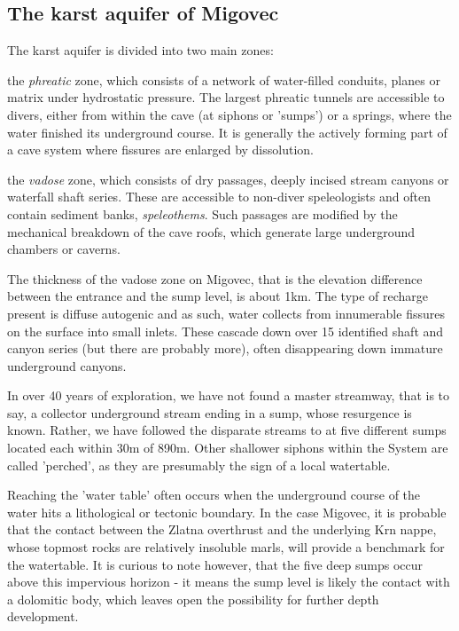 \subsection{The karst aquifer of Migovec} 
The karst aquifer is divided into two main zones: \begin{citemize} 
\item the \emph{phreatic} zone, which consists of a network of water-filled conduits, planes or matrix under hydrostatic pressure. The largest phreatic tunnels are accessible to divers, either from within the cave (at siphons or 'sumps') or a springs, where the water finished its underground course. It is generally the actively forming part of a cave system where fissures are enlarged by dissolution.
\item the \emph{vadose} zone, which consists of dry passages, deeply incised stream canyons or waterfall shaft series. These are accessible to non-diver speleologists and often contain sediment banks, \emph{speleothems}. Such passages are modified by the mechanical breakdown of the cave roofs, which generate large underground chambers or caverns.
\end{citemize}

The thickness of the vadose zone on Migovec, that is the elevation difference between the entrance and the sump level, is about 1km. The type of recharge present is diffuse autogenic and as such, water collects from innumerable fissures on the surface into small inlets. These cascade down over 15 identified shaft and canyon series (but there are probably more), often disappearing down immature underground canyons. 

In over 40 years of exploration, we have not found a master streamway, that is to say, a collector underground stream ending in a sump, whose resurgence is known. Rather, we have followed the disparate streams to at five different sumps located each within 30m of 890m. Other shallower siphons within the System are called 'perched', as they are presumably the sign of a local watertable.

Reaching the 'water table' often occurs when the underground course of the water hits a lithological or tectonic boundary. In the case Migovec, it is probable that the contact between the Zlatna overthrust and the underlying Krn nappe, whose topmost rocks are relatively insoluble marls, will provide a benchmark for the watertable. It is curious to note however, that the five deep sumps occur above this impervious horizon - it means the sump level is likely the contact with a dolomitic body, which leaves open the possibility for further depth development. 

